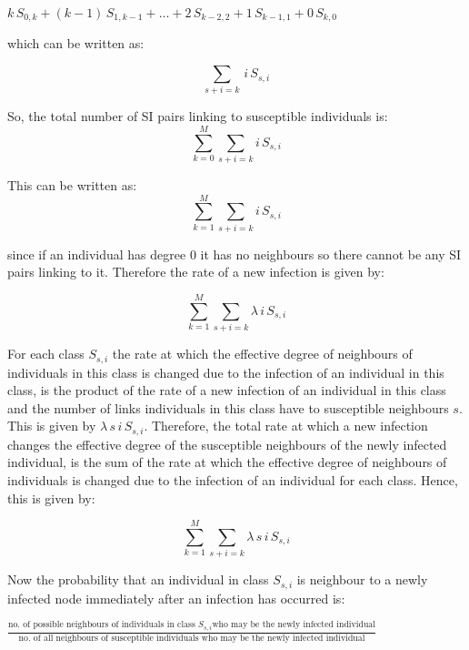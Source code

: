 \documentclass{uonmathsreport}
\begin{document}
$k\,S_{0,k}+(k-1)\,S_{1,k-1}+…+2\,S_{k-2,2}+1\,S_{k-1,1}+0\,S_{k,0}$

\noindent
which can be written as:

\begin{equation}
\sum_{s+i=k}\,i\,S_{s,i}
\end{equation}

\noindent
So, the total number of SI pairs linking to susceptible individuals is:
\begin{equation}
\sum_{k=0}^{M}\sum_{s+i=k}i\,S_{s,i}
\end{equation}

\noindent
This can be written as:
\begin{equation}
\sum_{k=1}^{M}\sum_{s+i=k}i\,S_{s,i}
\end{equation}

\noindent
since if an individual has degree $0$ it has no neighbours so there cannot be any SI pairs linking to it. Therefore the rate of a new infection is given by:

\begin{equation}
\label{rate of a new infection}
\sum_{k=1}^{M}\sum_{s+i=k}\lambda\,i\,S_{s,i}
\end{equation}

For each class $S_{s,i}$ the rate at which the effective degree of neighbours of individuals in this class is changed due to the infection of an individual in this class, is the product of the rate of a new infection of an individual in this class and the number of links individuals in this class have to susceptible neighbours $s$. This is given by $\lambda\, s\, i\, S_{s,i}$. Therefore, the total rate at which a new infection changes the effective degree of the susceptible neighbours of the newly infected individual, is the sum of the rate at which the effective degree of neighbours of individuals is changed due to the infection of an individual for each class. Hence, this is given by:

\begin{equation} \label{rate at which a new infection changes susceptible neighbour degree}
\sum_{k=1}^{M}\sum_{s+i=k}\lambda\,s\,i\,S_{s,i}
\end{equation}

Now the probability that an individual in class $S_{s,i}$ is neighbour to a newly infected node immediately after an infection has occurred is:

\bigskip
\noindent
\Large
$\frac{\text{no. of possible neighbours of individuals in class }S_{s,i} \text{who may be the newly infected individual}}{\text{no. of all neighbours of susceptible individuals who may be the newly infected individual}}$
\normalsize
\end{document}
